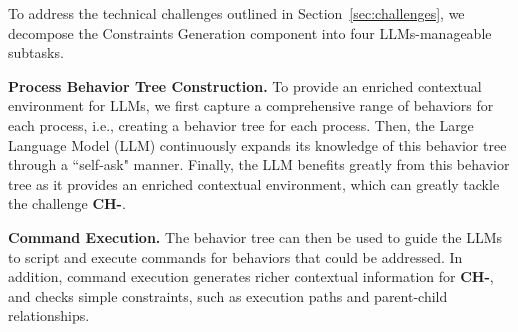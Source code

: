 To address the technical challenges outlined in Section~\ref{sec:challenges}, we decompose the Constraints Generation component into four LLMs-manageable subtasks.




\noindent
{\bf Process Behavior Tree Construction.} To provide an enriched contextual environment for LLMs, we first capture a comprehensive range of behaviors for each process, i.e., creating a behavior tree for each process. Then, the Large Language Model (LLM) continuously expands its knowledge of this behavior tree through a ``self-ask" manner. Finally, the LLM benefits greatly from this behavior tree as it provides an enriched contextual environment, which can greatly tackle the challenge {\bf CH-}.

\noindent
{\bf Command Execution.} The behavior tree can then be used to guide the LLMs to script and execute commands for behaviors that could be addressed. In addition, command execution generates richer contextual information for {\bf CH-}, and checks simple constraints, such as execution paths and parent-child relationships. 

